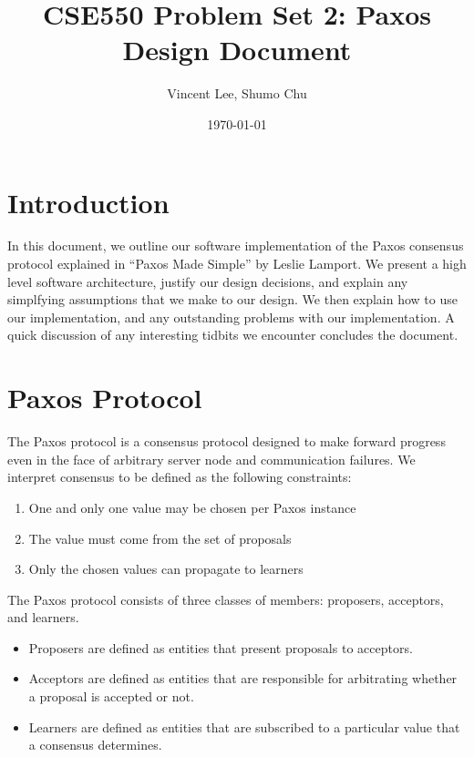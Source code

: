\documentclass{article}
\begin{document}
\title{CSE550 Problem Set 2: Paxos Design Document}
\author{Vincent Lee, Shumo Chu}
\date{\today}

\maketitle

\tableofcontents


\section{Introduction}

In this document, we outline our software implementation of the Paxos consensus protocol explained in ``Paxos Made Simple'' by Leslie Lamport.
We present a high level software architecture, justify our design decisions, and explain any simplfying assumptions that we make to our design.
We then explain how to use our implementation, and any outstanding problems with our implementation.
A quick discussion of any interesting tidbits we encounter concludes the document.


\section{Paxos Protocol}

The Paxos protocol is a consensus protocol designed to make forward progress even in the face of arbitrary server node and communication failures.
We interpret consensus to be defined as the following constraints:

\begin{enumerate}
\item One and only one value may be chosen per Paxos instance
\item The value must come from the set of proposals
\item Only the chosen values can propagate to learners
\end{enumerate}

The Paxos protocol consists of three classes of members: proposers, acceptors, and learners.
\begin{itemize}
\item Proposers are defined as entities that present proposals to acceptors.
\item Acceptors are defined as entities that are responsible for arbitrating whether a proposal is accepted or not.
\item Learners are defined as entities that are subscribed to a particular value that a consensus determines.
\end{itemize}
\end{document}
